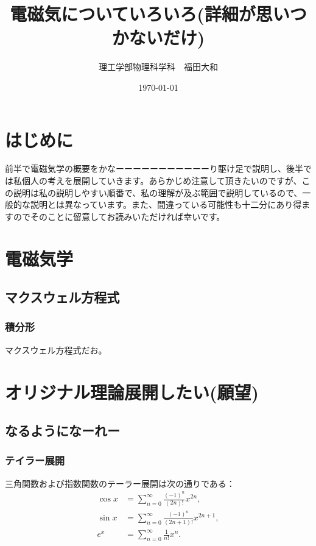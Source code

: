 \documentclass[11pt,b5paper,papersize,dvipdfmx]{jsarticle}
\title{電磁気についていろいろ(詳細が思いつかないだけ)} %
\author{理工学部物理科学科　福田大和} %
\date{\today} %
\begin{document}
\maketitle %
\setcounter{tocdepth}{2} %
\tableofcontents %

\clearpage %

\section*{はじめに}
前半で電磁気学の概要をかなーーーーーーーーーーーり駆け足で説明し、後半では私個人の考えを展開していきます。あらかじめ注意して頂きたいのですが、この説明は私の説明しやすい順番で、私の理解が及ぶ範囲で説明しているので、一般的な説明とは異なっています。また、間違っている可能性も十二分にあり得ますのでそのことに留意してお読みいただければ幸いです。

\section{電磁気学}
\subsection{マクスウェル方程式}
\subsubsection{積分形}
マクスウェル方程式だお。
\section{オリジナル理論展開したい(願望)}
\subsection{なるようになーれー}

\subsubsection{テイラー展開}
三角関数および指数関数のテーラー展開は次の通りである：
\begin{align}
    \cos x &= \sum_{n=0}^\infty \frac{(-1)^n}{(2n)!} x^{2n}, \label{eq:cos}\\
    \sin x &= \sum_{n=0}^\infty \frac{(-1)^n}{(2n+1)!} x^{2n+1}, \label{eq:sin}\\
    e^x &= \sum_{n=0}^\infty \frac{1}{n!} x^n. \label{eq:exp}
\end{align}
\end{document}
